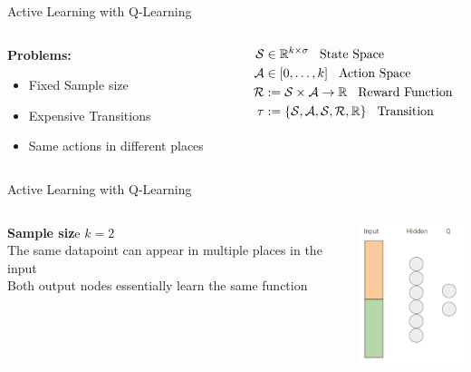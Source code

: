 \documentclass[aspectratio=169, 11pt, invertlogo]{ismll-slides}
\begin{document}
\begin{frame}[fragile]{Active Learning with Q-Learning}
	\begin{columns}
		\begin{column}{.4\linewidth}
			\textbf{Problems:}
			\begin{itemize}
				\item Fixed Sample size
				\item Expensive Transitions
				\item Same actions in different places
			\end{itemize}
		\end{column}
		\begin{column}{.4\linewidth}
			\begin{align*}
				\mathcal{S} &\in \mathbb{R}^{k \times \sigma} \hspace{3mm}\text{State Space} \\
				\mathcal{A} &\in [0, \ldots, k] \hspace{3mm}\text{Action Space} \\
				\mathcal{R} &:= \mathcal{S} \times \mathcal{A} \rightarrow \mathbb{R} \hspace{3mm}\text{Reward Function} \\
				\tau &:= \{ \mathcal{S}, \mathcal{A}, \mathcal{S}, \mathcal{R}, \mathbb{R} \} \hspace{3mm}\text{Transition} \\
			\end{align*}
		\end{column}
	\end{columns}
\end{frame}



\begin{frame}[fragile]{Active Learning with Q-Learning}
	\begin{columns}
		\begin{column}{.4\linewidth}
			\textbf{Sample siz}e $k = 2$ \\[2mm]
			The same datapoint can appear in multiple places in the input \\[2mm]
			Both output nodes essentially learn the same function
		\end{column}
		\begin{column}{.4\linewidth}
			\includegraphics[width=120px]{pics/q}
		\end{column}
	\end{columns}
\end{frame}
\end{document}
